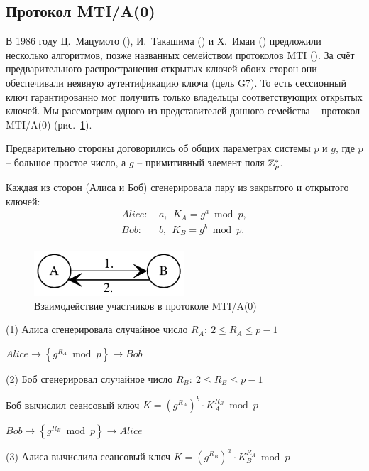 \subsection{Протокол MTI/A(0)}\label{section-protocols-mti}

В 1986 году Ц.~Мацумото (), И.~Такашима () и Х.~Имаи () предложили несколько алгоритмов, позже названных семейством протоколов MTI (\cite{Matsumoto:Tsutomu:Imai:1986}). За счёт предварительного распространения открытых ключей обоих сторон они обеспечивали неявную аутентификацию ключа (цель G7). То есть сессионный ключ гарантированно мог получить только владельцы соответствующих открытых ключей. Мы рассмотрим одного из представителей данного семейства -- протокол MTI/A(0) (рис.~\ref{fig:key_distribution-mti}).

Предварительно стороны договорились об общих параметрах системы $p$ и $g$, где $p$ -- большое простое число, а $g$ -- примитивный элемент поля $\mathbb{Z}_p^*$.

Каждая из сторон (Алиса и Боб) сгенерировала пару из закрытого и открытого ключей:
\[\begin{array}{ll}
    Alice: & ~ a, ~~ K_A = g^a \bmod p, \\
    Bob: & ~ b, ~~ K_B = g^b \bmod p. \\
\end{array}\]

\begin{figure}
    \centering
    \includegraphics[width=0.5\textwidth]{pic/key_distribution-mti}
    \caption{Взаимодействие участников в протоколе MTI/A(0)\label{fig:key_distribution-mti}}
\end{figure}

\begin{protocol}
    \item[(1)] Алиса сгенерировала случайное число $R_A: ~ 2\leq R_A\leq p-1$
    \item[{}] $ Alice \to \left\{ g^{R_A} \bmod p \right\} \to Bob$
    \item[(2)] Боб сгенерировал случайное число $R_B: ~ 2\leq R_B\leq p-1$
    \item[{}] Боб вычислил сеансовый ключ $K = (g^{R_A})^b \cdot K_A^{R_B} \bmod p$
    \item[{}] $ Bob \to \left\{ g^{R_B} \bmod p \right\} \to Alice$
    \item[(3)] Алиса вычислила сеансовый ключ $K = (g^{R_B})^a \cdot K_B^{R_A} \bmod p$
\end{protocol}

